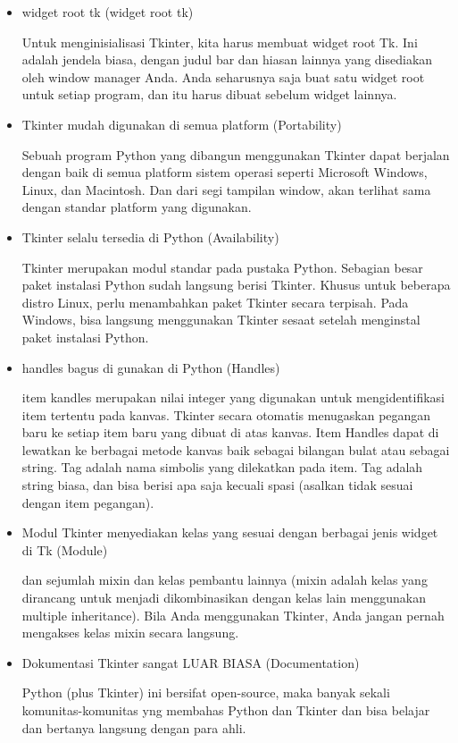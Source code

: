 \documentclass [12pt,a4paper,notitlepage,oneside,bahasa]{article}
\begin{document}
\begin{itemize}
	\item widget root tk (widget root tk)\vspace{\baselineskip} \par
	Untuk menginisialisasi Tkinter, kita harus membuat widget root Tk. Ini adalah jendela biasa, dengan judul bar dan hiasan lainnya yang disediakan oleh window manager Anda. Anda seharusnya saja buat satu widget root untuk setiap program, dan itu harus dibuat sebelum widget lainnya. \par
\noindent 
	\item Tkinter mudah digunakan di semua platform (Portability)\vspace{\baselineskip} \par
	Sebuah program Python yang dibangun menggunakan Tkinter dapat berjalan dengan baik di semua platform sistem operasi seperti Microsoft Windows, Linux, dan Macintosh. Dan dari segi tampilan window, akan terlihat sama dengan standar platform yang digunakan. \par
\noindent 
	\item Tkinter selalu tersedia di Python (Availability)\vspace{\baselineskip} \par
	Tkinter merupakan modul standar pada pustaka Python. Sebagian besar paket instalasi Python sudah langsung berisi Tkinter. Khusus untuk beberapa distro Linux, perlu menambahkan paket Tkinter secara terpisah. Pada Windows, bisa langsung menggunakan Tkinter sesaat setelah menginstal paket instalasi Python. \par
\noindent 
	\item handles bagus di gunakan di Python (Handles)\vspace{\baselineskip} \par
	item kandles merupakan nilai integer yang digunakan untuk mengidentifikasi item tertentu pada kanvas. Tkinter secara otomatis menugaskan pegangan baru ke setiap item baru yang dibuat di atas kanvas. Item Handles dapat di lewatkan ke berbagai metode kanvas baik sebagai bilangan bulat atau sebagai string. Tag adalah nama simbolis yang dilekatkan pada item. Tag adalah string biasa, dan bisa berisi apa saja kecuali spasi (asalkan tidak sesuai dengan item pegangan). \par
\noindent 
	\item Modul Tkinter menyediakan kelas yang sesuai dengan berbagai jenis widget di Tk (Module)\vspace{\baselineskip} \par
	dan sejumlah mixin dan kelas pembantu lainnya (mixin adalah kelas yang dirancang untuk menjadi dikombinasikan dengan kelas lain menggunakan multiple inheritance). Bila Anda menggunakan Tkinter, Anda jangan pernah mengakses kelas mixin secara langsung. \par
\noindent 
	\item Dokumentasi Tkinter sangat LUAR BIASA (Documentation)\vspace{\baselineskip} \par
	Python (plus Tkinter) ini bersifat open-source, maka banyak sekali komunitas-komunitas yng membahas Python dan Tkinter dan bisa belajar dan bertanya langsung dengan para ahli.
\end{itemize}
\end{document}
